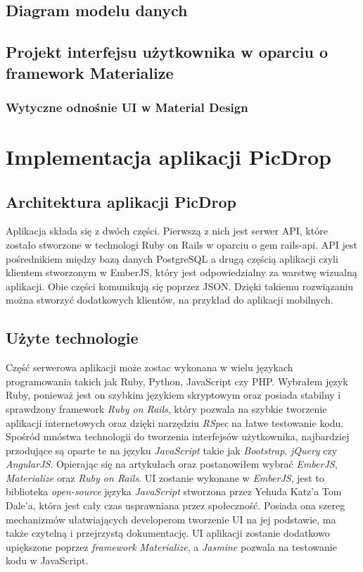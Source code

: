 \documentclass[brudnopis]{xmgr}
\begin{document}
\section{Diagram modelu danych}
\section{Projekt interfejsu użytkownika w oparciu o framework Materialize}
\subsection{Wytyczne odnośnie UI w Material Design}

\chapter{Implementacja aplikacji PicDrop}
\section{Architektura aplikacji PicDrop}

Aplikacja składa się z dwóch części. Pierwszą z nich jest serwer API, które zostało stworzone w technologi Ruby on Rails w oparciu o gem rails-api. API jest pośrednikiem między bazą danych PostgreSQL a drugą częścią aplikacji czyli klientem stworzonym w EmberJS, który jest odpowiedzialny za warstwę wizualną aplikacji. Obie części komunikują się poprzez  JSON. Dzięki takiemu rozwiązaniu można stworzyć dodatkowych klientów, na przykład do aplikacji mobilnych.

\section{Użyte technologie}
Część serwerowa aplikacji może zostac wykonana w wielu językach programowania takich jak Ruby, Python, JavaScript czy PHP.
Wybrałem język Ruby, ponieważ jest on szybkim językiem skryptowym oraz posiada stabilny i sprawdzony framework \textit{Ruby on Rails}, który pozwala na szybkie tworzenie aplikacji internetowych oraz dzięki narzędziu \textit{RSpec} na łatwe testowanie kodu. 
Spośród mnóstwa technologii do tworzenia interfejsów użytkownika, najbardziej przodujące są oparte te na języku \textit{JavaScript} takie jak \textit{Bootstrap},\textit{ jQuery} czy\\ \textit{AngularJS}. Opierając się na artykułach \cite{} oraz \cite{} postanowiłem wybrać \textit{EmberJS}, \textit{Materialize} oraz \textit{Ruby on Rails}. UI zostanie wykonane w \textit{EmberJS}, jest to  biblioteka  \textit{open-source} języka \textit{JavaScript} stworzona  przez  Yehuda Katz'a  Tom Dale'a, która jest cały czas usprawniana przez społeczność. Posiada ona szereg mechanizmów ułatwiających developerom tworzenie UI na jej podstawie, ma także czytelną i przejrzystą dokumentację. UI aplikacji zostanie dodatkowo upiększone poprzez \textit{framework Materialize}, a \textit{Jasmine} pozwala na testowanie kodu w JavaScript.
\end{document}

